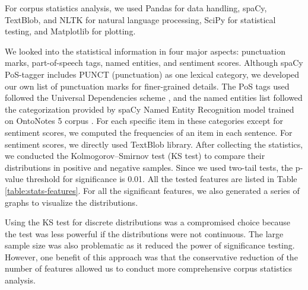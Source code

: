 \documentclass[12pt]{diazessay} %
\begin{document}
For corpus statistics analysis, we used Pandas for data handling, spaCy, TextBlob, and NLTK for natural language processing, SciPy for statistical testing, and Matplotlib for plotting. 

We looked into the statistical information in four major aspects: punctuation marks, part-of-speech tags, named entities, and sentiment scores. Although spaCy PoS-tagger includes PUNCT (punctuation) as one lexical category, we developed our own list of punctuation marks for finer-grained details. The PoS tags used followed the Universal Dependencies scheme \citep{pos-tag}, and the named entities list followed the categorization provided by spaCy Named Entity Recognition model trained on OntoNotes 5 corpus \citep{spacy-named-entity}. For each specific item in these categories except for sentiment scores, we computed the frequencies of an item in each sentence. For sentiment scores, we directly used TextBlob library. After collecting the statistics, we conducted the Kolmogorov–Smirnov test (KS test) to compare their distributions in positive and negative samples. Since we used two-tail tests, the p-value threshold for significance is 0.01. All the tested features are listed in Table \ref{table:stats-features}. For all the significant features, we also generated a series of graphs to visualize the distributions. 

Using the KS test for discrete distributions was a compromised choice because the test was less powerful if the distributions were not continuous. The large sample size was also problematic as it reduced the power of significance testing. However, one benefit of this approach was that the conservative reduction of the number of features allowed us to conduct more comprehensive corpus statistics analysis.
\end{document}
